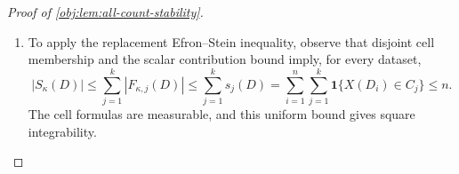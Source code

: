 \documentclass[11pt]{article}
\begin{document}
\begin{proof}[Proof of \cref{obj:lem:all-count-stability}]
\begin{enumerate}
The original and replacement datasets have the same erased cell tuples. Applying the preceding estimate to both gives
\[
\begin{aligned}
|F_{\kappa,j}(D)-F_{\kappa,j}(D^{(i_\star)})|
\le{}&
3\,\mathbf1\{X(D_{i_\star})\in C_j,\ B_{j,i_\star}(D)\ge1\}\\
&+3\,\mathbf1\{X(o^\star)\in C_j,\ B_{j,i_\star}(D)\ge1\}.
\end{aligned}
\]
Summing over cells and using the partner-indicator identity therefore yields
\[
|S_\kappa(D)-S_\kappa(D^{(i_\star)})|
\le3\bigl(J_{i_\star}^{\mathrm{old}}+J_{i_\star}^{\mathrm{new}}\bigr).
\]
Both indicators take values in \(\{0,1\}\). Squaring this bound and checking their four possible pairs gives
\[
\begin{aligned}
\bigl(S_\kappa(D)-S_\kappa(D^{(i_\star)})\bigr)^2
&\le9\bigl(J_{i_\star}^{\mathrm{old}}+J_{i_\star}^{\mathrm{new}}\bigr)^2\\
&\le18\bigl(J_{i_\star}^{\mathrm{old}}+J_{i_\star}^{\mathrm{new}}\bigr).
\end{aligned}
\]
For the pairs \((0,0),(1,0),(0,1),(1,1)\), the middle expression is respectively \(0,9,9,36\), while the final expression is \(0,18,18,36\).

The bounded measurable statistics and indicators make these expressions integrable. Taking expectations and applying the partner expectation from the preceding step gives, for every record position,
\[
\begin{aligned}
\mathbb E\bigl(S_N(D)-S_N(D^{(i_\star)})\bigr)^2
&\le18\,\mathbb E\bigl[J_{i_\star}^{\mathrm{old}}
+J_{i_\star}^{\mathrm{new}}\bigr]
=\frac{36W(P)}n,\\
\mathbb E\bigl(S_D(D)-S_D(D^{(i_\star)})\bigr)^2
&\le18\,\mathbb E\bigl[J_{i_\star}^{\mathrm{old}}
+J_{i_\star}^{\mathrm{new}}\bigr]
=\frac{36W(P)}n.
\end{aligned}
\]

\item To apply the replacement Efron--Stein inequality, observe that disjoint cell membership and the scalar contribution bound imply, for every dataset,
\[
|S_\kappa(D)|
\le\sum_{j=1}^k|F_{\kappa,j}(D)|
\le\sum_{j=1}^k s_j(D)
=\sum_{i=1}^n\sum_{j=1}^k\mathbf1\{X(D_i)\in C_j\}
\le n.
\]
The cell formulas are measurable, and this uniform bound gives square integrability.


\end{enumerate}
\end{proof}
\end{document}
